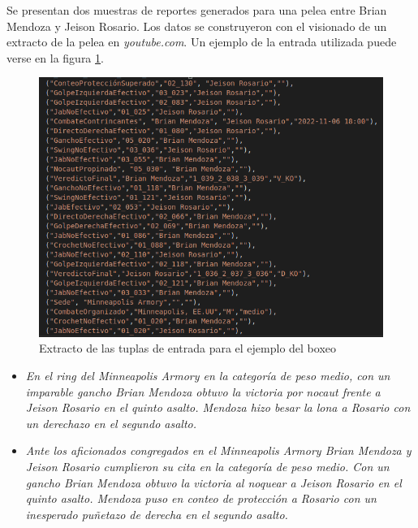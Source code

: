     Se presentan dos muestras de reportes generados para una pelea entre Brian Mendoza y Jeison Rosario. Los datos se construyeron con el 
visionado de un extracto de la pelea en \textit{youtube.com}. Un ejemplo de la entrada utilizada puede verse en la figura \ref{fig_entradaboxeo}.

    \begin{figure}[!]
        \begin{center}
            \includegraphics[scale=0.4]{Graphics/entradaboxeo.png}
        \end{center}
        \caption{Extracto de las tuplas de entrada para el ejemplo del boxeo}
        \label{fig_entradaboxeo}
    \end{figure}

    \begin{itemize}
        \item \textit{En el ring del Minneapolis Armory en la categoría de peso medio, con un imparable gancho Brian Mendoza obtuvo la victoria por nocaut frente 
        a Jeison Rosario en el quinto asalto.
        Mendoza hizo besar la lona a Rosario con un derechazo en el segundo asalto.}
        \item \textit{Ante los aficionados congregados en el Minneapolis Armory Brian Mendoza y Jeison Rosario cumplieron su cita en la categoría 
        de peso medio. Con un gancho Brian Mendoza obtuvo la victoria al noquear a Jeison Rosario en el quinto asalto.
        Mendoza puso en conteo de protección a Rosario con un inesperado puñetazo de derecha en el segundo asalto.}
    \end{itemize}
